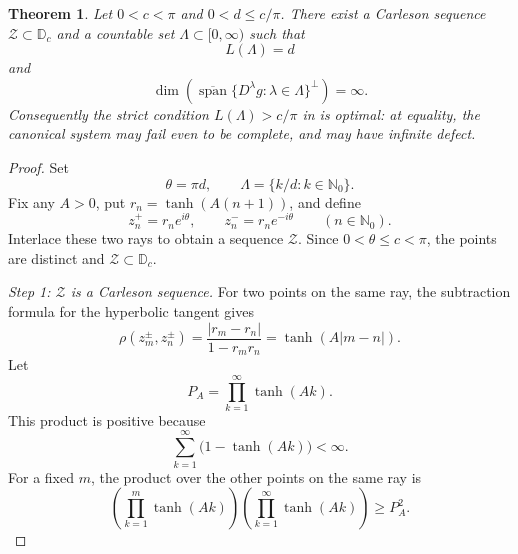 \documentclass[11pt]{article}
\newtheorem{theorem}{Theorem}
\theoremstyle{definition}
\newcommand{\D}{\mathbb D}
\newcommand{\N}{\mathbb N}
\newcommand{\Zcal}{\mathcal Z}
\newcommand{\Lam}{\Lambda}
\newcommand{\rhoh}{\rho}
\begin{document}
\begin{theorem}\label{thm:sharpness}
Let \(0<c<\pi\) and \(0<d\le c/\pi\).  There exist a Carleson sequence
\(\Zcal\subset\D_c\) and a countable set
\(\Lam\subset[0,\infty)\) such that
\[
 L(\Lam)=d
\]
and
\[
 \dim\left(
 \overline{\operatorname{span}}\{D^\lambda g:\lambda\in\Lam\}^{\perp}
 \right)=\infty.
\]
Consequently the strict condition \(L(\Lam)>c/\pi\) in
\cite[Theorem~3.5]{KM} is optimal: at equality, the canonical system may
fail even to be complete, and may have infinite defect.
\end{theorem}

\begin{proof}
Set
\[
 \theta=\pi d,\qquad
 \Lam=\{k/d:k\in\N_0\}.
\]
Fix any \(A>0\), put \(r_n=\tanh(A(n+1))\), and define
\[
 z_n^+=r_ne^{i\theta},
 \qquad
 z_n^-=r_ne^{-i\theta}
 \qquad(n\in\N_0).
\]
Interlace these two rays to obtain a sequence \(\Zcal\).  Since
\(0<\theta\le c<\pi\), the points are distinct and
\(\Zcal\subset\D_c\).

\medskip
\noindent\emph{Step 1: \(\Zcal\) is a Carleson sequence.}
For two points on the same ray, the subtraction formula for the hyperbolic
tangent gives
\begin{equation}\label{eq:same-ray}
 \rhoh(z_m^\pm,z_n^\pm)
 =\frac{|r_m-r_n|}{1-r_mr_n}
 =\tanh(A|m-n|).
\end{equation}
Let
\[
 P_A=\prod_{k=1}^{\infty}\tanh(Ak).
\]
This product is positive because
\[
 \sum_{k=1}^{\infty}\bigl(1-\tanh(Ak)\bigr)<\infty.
\]
For a fixed \(m\), the product over the other points on the same ray is
\begin{equation}\label{eq:withinproduct}
 \left(\prod_{k=1}^{m}\tanh(Ak)\right)
 \left(\prod_{k=1}^{\infty}\tanh(Ak)\right)
 \ge P_A^2.
\end{equation}


\end{proof}
\end{document}
